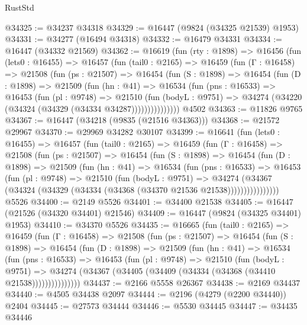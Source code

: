 \begin{lexlean}{RustStd}
\begin{coremodule}
@34325 := @34237 @34318
@34329 := @16447 (@9824 (@34325 @21539) @1953)
@34331 := @34277 (@16494 @34318)
@34332 := @16479 @34331
@34334 := @16447 (@34332 @21569)
@34362 := @16619
    (fun (rty : @1898) =>
    @16456
      (fun (lets0 : @16455) =>
      @16457
        (fun (tail0 : @2165) =>
        @16459
          (fun (Γ : @16458) =>
          @21508
            (fun (ps : @21507) =>
            @16454
              (fun (S : @1898) =>
              @16454
                (fun (D : @1898) =>
                @21509
                  (fun (hn : @41) =>
                  @16534
                    (fun (pns : @16533) =>
                    @16453
                      (fun (pl : @9748) =>
                      @21510
                        (fun (bodyL : @9751) =>
                        @34274 (@34220 (@34324 (@34329 (@34334 @34287)))))))))))))))
    @4502
@34363 := @11826 @9765
@34367 := @16447 (@34218 (@9835 (@21516 @34363)))
@34368 := @21572 @29967
@34370 := @29969 @34282 @30107
@34399 := @16641
    (fun (lets0 : @16455) =>
    @16457
      (fun (tail0 : @2165) =>
      @16459
        (fun (Γ : @16458) =>
        @21508
          (fun (ps : @21507) =>
          @16454
            (fun (S : @1898) =>
            @16454
              (fun (D : @1898) =>
              @21509
                (fun (hn : @41) =>
                @16534
                  (fun (pns : @16533) =>
                  @16453
                    (fun (pl : @9748) =>
                    @21510
                      (fun (bodyL : @9751) =>
                      @34274
                        (@34367
                          (@34324 (@34329 (@34334 (@34368 (@34370 @21536 @21538))))))))))))))))
    @5526
@34400 := @2149 @5526
@34401 := @34400 @21538
@34405 := @16447 (@21526 (@34320 @34401) @21546)
@34409 := @16447 (@9824 (@34325 @34401) @1953)
@34410 := @34370 @5526
@34435 := @16665
    (fun (tail0 : @2165) =>
    @16459
      (fun (Γ : @16458) =>
      @21508
        (fun (ps : @21507) =>
        @16454
          (fun (S : @1898) =>
          @16454
            (fun (D : @1898) =>
            @21509
              (fun (hn : @41) =>
              @16534
                (fun (pns : @16533) =>
                @16453
                  (fun (pl : @9748) =>
                  @21510
                    (fun (bodyL : @9751) =>
                    @34274 (@34367 (@34405 (@34409 (@34334 (@34368 (@34410 @21538)))))))))))))))
@34437 := @2166 @5558 @26367
@34438 := @2169 @34437
@34440 := @4505 @34438 @2097
@34444 := @2196 (@4279 (@2200 @34440)) @2404
@34445 := @27573 @34444
@34446 := @5530 @34445
@34447 := @34435 @34446

\end{coremodule}
\end{lexlean}
